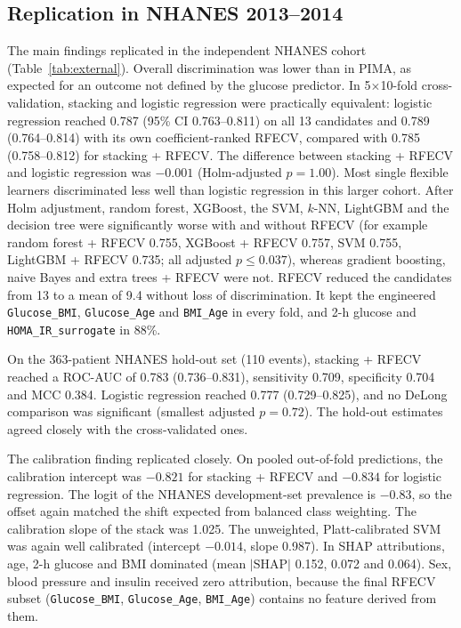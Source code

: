 \documentclass[preprint,12pt,authoryear=false]{elsarticle}
\begin{document}
\subsection{Replication in NHANES 2013--2014}
The main findings replicated in the independent NHANES cohort (Table~\ref{tab:external}). Overall discrimination was lower than in PIMA, as expected for an outcome not defined by the glucose predictor. In 5$\times$10-fold cross-validation, stacking and logistic regression were practically equivalent: logistic regression reached 0.787 (95\% CI 0.763--0.811) on all 13 candidates and 0.789 (0.764--0.814) with its own coefficient-ranked RFECV, compared with 0.785 (0.758--0.812) for stacking + RFECV. The difference between stacking + RFECV and logistic regression was $-0.001$ (Holm-adjusted $p = 1.00$). Most single flexible learners discriminated less well than logistic regression in this larger cohort. After Holm adjustment, random forest, XGBoost, the SVM, $k$-NN, LightGBM and the decision tree were significantly worse with and without RFECV (for example random forest + RFECV 0.755, XGBoost + RFECV 0.757, SVM 0.755, LightGBM + RFECV 0.735; all adjusted $p \leq 0.037$), whereas gradient boosting, naive Bayes and extra trees + RFECV were not. RFECV reduced the candidates from 13 to a mean of 9.4 without loss of discrimination. It kept the engineered \texttt{Glucose\_BMI}, \texttt{Glucose\_Age} and \texttt{BMI\_Age} in every fold, and 2-h glucose and \texttt{HOMA\_IR\_surrogate} in 88\%.

On the 363-patient NHANES hold-out set (110 events), stacking + RFECV reached a ROC-AUC of 0.783 (0.736--0.831), sensitivity 0.709, specificity 0.704 and MCC 0.384. Logistic regression reached 0.777 (0.729--0.825), and no DeLong comparison was significant (smallest adjusted $p = 0.72$). The hold-out estimates agreed closely with the cross-validated ones.

The calibration finding replicated closely. On pooled out-of-fold predictions, the calibration intercept was $-0.821$ for stacking + RFECV and $-0.834$ for logistic regression. The logit of the NHANES development-set prevalence is $-0.83$, so the offset again matched the shift expected from balanced class weighting. The calibration slope of the stack was 1.025. The unweighted, Platt-calibrated SVM was again well calibrated (intercept $-0.014$, slope 0.987). In SHAP attributions, age, 2-h glucose and BMI dominated (mean $|\mathrm{SHAP}|$ 0.152, 0.072 and 0.064). Sex, blood pressure and insulin received zero attribution, because the final RFECV subset (\texttt{Glucose\_BMI}, \texttt{Glucose\_Age}, \texttt{BMI\_Age}) contains no feature derived from them.
\end{document}
